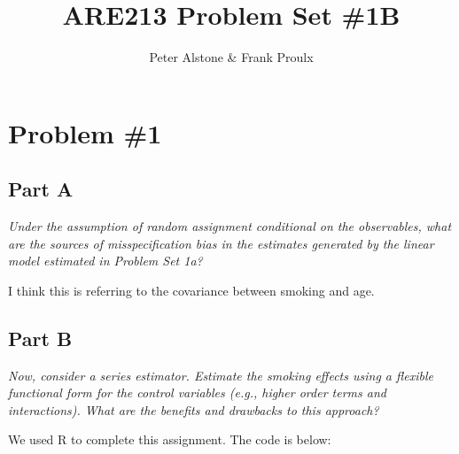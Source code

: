 \documentclass[letterpaper, 12pt]{article}
\begin{document}
\title{ARE213 Problem Set \#1B}
\author{Peter Alstone \& Frank Proulx}
\maketitle

\section{Problem \#1}
\subsection{Part A}
\emph{Under the assumption of random assignment conditional on the observables, what are the sources of misspecification bias in the estimates generated by the linear model estimated in Problem Set 1a?}

I think this is referring to the covariance between smoking and age.




\subsection{Part B}
\emph{Now, consider a series estimator. Estimate the smoking effects using a flexible functional form for the control variables (e.g., higher order terms and interactions). What are the benefits and drawbacks to this approach?}



We used R to complete this assignment.  The code is below:




\end{document}
